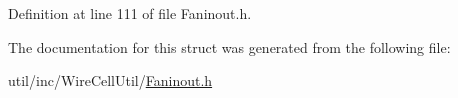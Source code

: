 Definition at line 111 of file Faninout.\+h.



The documentation for this struct was generated from the following file\+:\begin{DoxyCompactItemize}
\item 
util/inc/\+Wire\+Cell\+Util/\hyperlink{_faninout_8h}{Faninout.\+h}\end{DoxyCompactItemize}
